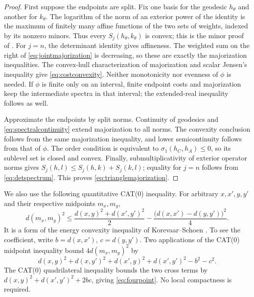 \begin{proof}
First suppose the endpoints are split. Fix one basis for the geodesic
$h_\theta$ and another for $k_\theta$. The logarithm of the norm of an
exterior power of the identity is the maximum of finitely many affine
functions of the two sets of weights, indexed by its nonzero minors.
Thus every $S_j(h_\theta,k_\theta)$ is convex; this is the minor proof
of \cite[Lemma~6.16]{HKKP26}. For $j=n$, the determinant identity gives
affineness. The weighted sum on the right of
\eqref{eq:jointmajorization} is decreasing, so these are exactly the
majorization inequalities. The convex-hull characterization of
majorization and scalar Jensen's inequality give
\eqref{eq:costconvexity}. Neither monotonicity nor evenness of $\phi$
is needed. If $\phi$ is finite only on an interval, finite endpoint
costs and majorization keep the intermediate spectra in that interval;
the extended-real inequality follows as well.

Approximate the endpoints by split norms. Continuity of geodesics and
\eqref{eq:spectralcontinuity} extend majorization to all norms. The
convexity conclusion follows from the same majorization inequality,
and lower semicontinuity follows from that of $\phi$.
The order condition is equivalent to $\sigma_1(h_C,h_A)\le0$, so its
sublevel set is closed and convex. Finally, submultiplicativity of
exterior operator norms gives
$S_j(h,l)\le S_j(h,k)+S_j(k,l)$; equality for $j=n$ follows from
\eqref{eq:detspectrum}. This proves \eqref{eq:trianglemajorization}.
\end{proof}

We also use the following quantitative CAT(0) inequality. For arbitrary
$x,x',y,y'$ and their respective midpoints $m_x,m_y$,
\begin{equation}\label{eq:fourpoint}
 d(m_x,m_y)^2\le
 \frac{d(x,y)^2+d(x',y')^2}{2}
 -\frac{\bigl(d(x,x')-d(y,y')\bigr)^2}{4}.
\end{equation}
It is a form of the energy convexity inequality of
Korevaar--Schoen \cite[Proposition~1.3, equation~(1.3.2)]{KS97}. To see the coefficient,
write $b=d(x,x')$, $c=d(y,y')$. Two applications of the CAT(0)
midpoint inequality bound $4d(m_x,m_y)^2$ by
\[
 d(x,y)^2+d(x,y')^2+d(x',y)^2+d(x',y')^2-b^2-c^2.
\]
The CAT(0) quadrilateral inequality bounds the two cross terms by
$d(x,y)^2+d(x',y')^2+2bc$, giving \eqref{eq:fourpoint}.
No local compactness is required.

